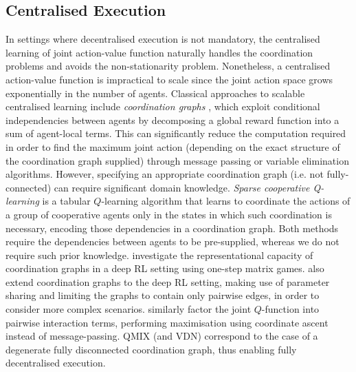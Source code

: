 \documentclass[twoside,11pt]{article}
\renewcommand{\cite}{\citep}
\begin{document}
\subsection{Centralised Execution}
In settings where decentralised execution is not mandatory, 
the centralised learning of joint action-value function naturally handles the
coordination problems and avoids the non-stationarity problem. Nonetheless, a centralised action-value function is impractical to scale since the joint action space grows exponentially in the number of agents.
Classical approaches to scalable centralised learning include 
\textit{coordination graphs} \cite{guestrin_multiagent_2002}, which exploit conditional independencies between agents by decomposing a global reward function 
into a sum of agent-local terms.
This can significantly reduce the computation required in order to find the maximum joint action (depending on the exact structure of the coordination graph supplied) through message passing or variable elimination algorithms.
However, specifying an appropriate coordination graph (i.e. not fully-connected) can require significant domain knowledge.
\textit{Sparse cooperative Q-learning} \cite{kok_collaborative_2006} is a tabular $Q$-learning 
algorithm that learns to coordinate the actions of a group of cooperative 
agents only in the states in which such coordination is necessary, encoding
those dependencies in a coordination graph. 
Both methods require the dependencies between agents to be pre-supplied, whereas we do not require such prior knowledge. 
\citet{castellini2019representational} investigate the representational capacity of coordination graphs in a deep RL setting using one-step matrix games.
\citet{bohmer_deep_2019} also extend coordination graphs to the deep RL setting, making use of parameter sharing and limiting the graphs to contain only pairwise edges, in order to consider more complex scenarios. 
\citet{chen_factorized_2018} similarly factor the joint $Q$-function into pairwise interaction terms, performing maximisation using coordinate ascent instead of message-passing.
QMIX (and VDN) correspond to the case of a degenerate fully disconnected coordination graph,  thus enabling fully decentralised execution.
\end{document}
